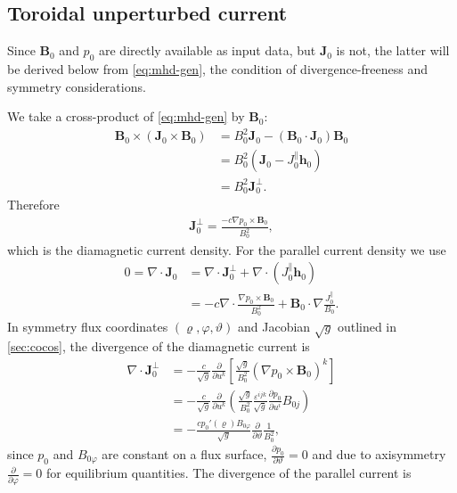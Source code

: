 \documentclass[a4paper, twoside, 10pt, english]{article}
\numberwithin{equation}{section}
\let\temp\varrho
\let\varrho\rho
\let\rho\temp
\let\temp\vartheta
\let\vartheta\theta
\let\theta\temp
\let\temp\varphi
\let\varphi\phi
\let\phi\temp
\let\vec\symbf
\newcommand*\grad{\ensuremath{\nabla}}
\newcommand*\divg{\ensuremath{\nabla \cdot}}
\newcommand*\pd[2][]{\ensuremath{\frac{\partial #1}{\partial #2}}}  %
\begin{document}
\subsection{Toroidal unperturbed current}
\label{sec:j0phi}

Since $\vec{B}_{0}$ and $p_{0}$ are directly available as input data, but $\vec{J}_{0}$ is not, the latter will be derived below from \cref{eq:mhd-gen}, the condition of divergence-freeness and symmetry considerations.

We take a cross-product of \cref{eq:mhd-gen} by $\vec{B}_{0}$:
\begin{align}
  \vec{B}_{0} \times \left( \vec{J}_{0} \times \vec{B}_{0} \right) &= B_{0}^{2} \vec{J}_{0} - (\vec{B}_{0} \cdot \vec{J}_{0}) \vec{B}_{0} \nonumber \\
  &= B_{0}^{2} (\vec{J}_{0} - J_{0}^{\parallel} \vec{h}_{0}) \nonumber \\
  &= B_{0}^{2} \vec{J}_{0}^{\perp}.
\end{align}
Therefore
\begin{gather}
  \vec{J}_{0}^{\perp} = \frac{-c \grad p_{0} \times \vec{B}_{0}}{B_{0}^{2}},
\end{gather}
which is the diamagnetic current density. For the parallel current density we use
\begin{align}
 0 = \divg \vec{J}_{0} &= \divg \vec{J}_{0}^{\perp} + \divg (J_{0}^{\parallel} \vec{h}_{0}) \nonumber \\
 &= -c \divg \frac{\grad p_{0} \times \vec{B}_{0}}{B_{0}^{2}} + \vec{B}_{0} \cdot \grad \frac{J_{0}^{\parallel}}{B_{0}}.
\end{align}
In symmetry flux coordinates $(\rho, \phi, \theta)$ and Jacobian $\sqrt{g}$ outlined in \cref{sec:cocos}, the divergence of the diamagnetic current is
\begin{align}
  \divg \vec{J}_{0}^{\perp} &= -\frac{c}{\sqrt{g}} \pd{u^{k}} \left[ \frac{\sqrt{g}}{B_{0}^{2}} \left( \grad p_{0} \times \vec{B}_{0} \right)^{k} \right] \nonumber \\
  &= -\frac{c}{\sqrt{g}} \pd{u^{k}} \left( \frac{\sqrt{g}}{B_{0}^{2}} \frac{\varepsilon^{ijk}}{\sqrt{g}} \pd[p_{0}]{u^{i}} B_{0 j} \right) \nonumber \\
  &= -\frac{c p_{0}' (\rho) B_{0 \phi}}{\sqrt{g}} \pd{\theta} \frac{1}{B_{0}^{2}},
\end{align}
since $p_{0}$ and $B_{0 \phi}$ are constant on a flux surface, $\pd[p_{0}]{\theta} = 0$ and due to axisymmetry $\pd{\phi} = 0$ for equilibrium quantities. The divergence of the parallel current is
\end{document}
